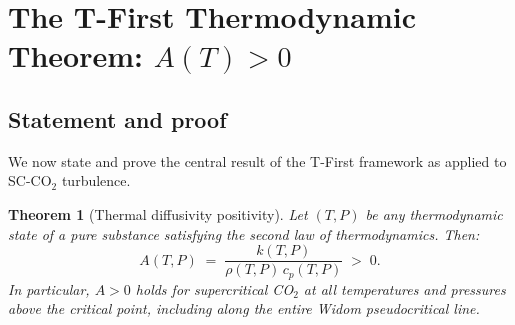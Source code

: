 \documentclass[12pt,a4paper]{article}
\newtheorem{theorem}{Theorem}[section]
\newcommand{\sco}{SC-CO$_2$}
\begin{document}
\section{The T-First Thermodynamic Theorem: $A(T) > 0$}
\label{sec:theorem}

\subsection{Statement and proof}
\label{sec:theorem:proof}

We now state and prove the central result of the T-First framework as applied to
\sco{} turbulence.

\begin{theorem}[Thermal diffusivity positivity]
  \label{thm:A_positive}
  Let $(T,P)$ be any thermodynamic state of a pure substance satisfying the
  second law of thermodynamics.  Then:
  \begin{equation}
    A(T,P) \;=\; \frac{k(T,P)}{\rho(T,P)\,c_p(T,P)} \;>\; 0.
    \label{eq:A_positive}
  \end{equation}
  In particular, $A > 0$ holds for supercritical CO$_2$ at all temperatures
  and pressures above the critical point, including along the entire Widom
  pseudocritical line.
\end{theorem}
\end{document}
